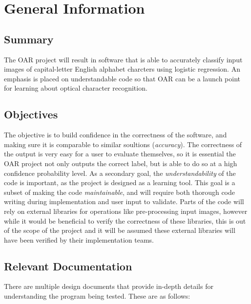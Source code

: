 \documentclass[12pt, titlepage]{article}
\begin{document}
\section{General Information}

\subsection{Summary}

The OAR project will result in software that is able to accurately classify input images of capital-letter English alphabet charcters using
logistic regression. An emphasis is placed on understandable code so that OAR can be a launch point for learning about optical
character recognition.

\subsection{Objectives}

The objective is to build confidence in the correctness of the software, and making sure it is comparable
to similar soultions (\textit{accuracy}). The correctness of the output is very easy for a user to evaluate themselves, so
it is essential the OAR project not only outputs the correct label, but is able to do so at a high confidence probability level.  
As a secondary goal, the \textit{understandability} of the code is important, as the project is designed as a learning tool.
This goal is a subset of making the code \textit{maintainable}, and will require both thorough code writing during implementation
and user input to validate. Parts of the code will rely on external libraries for operations like pre-processing input images,
however while it would be beneficial to verify the correctness of these libraries, this is out of the scope of the project and it will 
be assumed these external libraries will have been verified by their implementation teams.

\subsection{Relevant Documentation}

There are multiple design documents that provide in-depth details for understanding
the program being tested. These are as follows:
\end{document}
